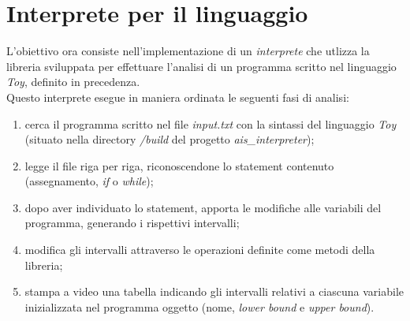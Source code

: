 \documentclass[a4paper, 10pt]{report}
\begin{document}
\section*{Interprete per il linguaggio}
L'obiettivo ora consiste nell'implementazione di un \textit{interprete} che utlizza la libreria sviluppata per effettuare l'analisi di un programma scritto nel linguaggio \textit{Toy}, definito in precedenza.\\
Questo interprete esegue in maniera ordinata le seguenti fasi di analisi:
\begin{enumerate}
	\item cerca il programma scritto nel file \textit{input.txt} con la sintassi del linguaggio \textit{Toy} (situato nella directory \textit{/build} del progetto \textit{ais\_interpreter});
	\item legge il file riga per riga, riconoscendone lo statement contenuto (assegnamento, \textit{if} o \textit{while});
	\item dopo aver individuato lo statement, apporta le modifiche alle variabili del programma, generando i rispettivi intervalli;
	\item modifica gli intervalli attraverso le operazioni definite come metodi della libreria;
	\item stampa a video una tabella indicando gli intervalli relativi a ciascuna variabile inizializzata nel programma oggetto (nome, \textit{lower bound} e \textit{upper bound}).
	\newline
\end{enumerate}
\end{document}
